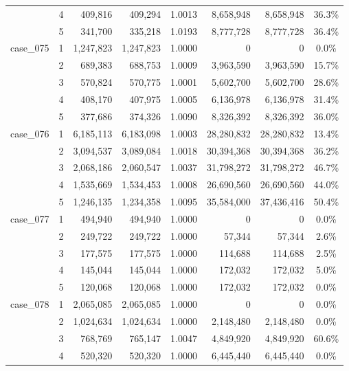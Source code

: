 \begin{footnotesize}
\begin{longtable}{l c rr c rr c}
 & 4 & 409{,}816 & 409{,}294 & 1.0013 & 8{,}658{,}948 & 8{,}658{,}948 & 36.3\% \\
 & 5 & 341{,}700 & 335{,}218 & 1.0193 & 8{,}777{,}728 & 8{,}777{,}728 & 36.4\% \\
\addlinespace[2pt]
case\_075 & 1 & 1{,}247{,}823 & 1{,}247{,}823 & 1.0000 & 0 & 0 & 0.0\% \\
 & 2 & 689{,}383 & 688{,}753 & 1.0009 & 3{,}963{,}590 & 3{,}963{,}590 & 15.7\% \\
 & 3 & 570{,}824 & 570{,}775 & 1.0001 & 5{,}602{,}700 & 5{,}602{,}700 & 28.6\% \\
 & 4 & 408{,}170 & 407{,}975 & 1.0005 & 6{,}136{,}978 & 6{,}136{,}978 & 31.4\% \\
 & 5 & 377{,}686 & 374{,}326 & 1.0090 & 8{,}326{,}392 & 8{,}326{,}392 & 36.0\% \\
\addlinespace[2pt]
case\_076 & 1 & 6{,}185{,}113 & 6{,}183{,}098 & 1.0003 & 28{,}280{,}832 & 28{,}280{,}832 & 13.4\% \\
 & 2 & 3{,}094{,}537 & 3{,}089{,}084 & 1.0018 & 30{,}394{,}368 & 30{,}394{,}368 & 36.2\% \\
 & 3 & 2{,}068{,}186 & 2{,}060{,}547 & 1.0037 & 31{,}798{,}272 & 31{,}798{,}272 & 46.7\% \\
 & 4 & 1{,}535{,}669 & 1{,}534{,}453 & 1.0008 & 26{,}690{,}560 & 26{,}690{,}560 & 44.0\% \\
 & 5 & 1{,}246{,}135 & 1{,}234{,}358 & 1.0095 & 35{,}584{,}000 & 37{,}436{,}416 & 50.4\% \\
\addlinespace[2pt]
case\_077 & 1 & 494{,}940 & 494{,}940 & 1.0000 & 0 & 0 & 0.0\% \\
 & 2 & 249{,}722 & 249{,}722 & 1.0000 & 57{,}344 & 57{,}344 & 2.6\% \\
 & 3 & 177{,}575 & 177{,}575 & 1.0000 & 114{,}688 & 114{,}688 & 2.5\% \\
 & 4 & 145{,}044 & 145{,}044 & 1.0000 & 172{,}032 & 172{,}032 & 5.0\% \\
 & 5 & 120{,}068 & 120{,}068 & 1.0000 & 172{,}032 & 172{,}032 & 0.0\% \\
\addlinespace[2pt]
case\_078 & 1 & 2{,}065{,}085 & 2{,}065{,}085 & 1.0000 & 0 & 0 & 0.0\% \\
 & 2 & 1{,}024{,}634 & 1{,}024{,}634 & 1.0000 & 2{,}148{,}480 & 2{,}148{,}480 & 0.0\% \\
 & 3 & 768{,}769 & 765{,}147 & 1.0047 & 4{,}849{,}920 & 4{,}849{,}920 & 60.6\% \\
 & 4 & 520{,}320 & 520{,}320 & 1.0000 & 6{,}445{,}440 & 6{,}445{,}440 & 0.0\% \\

\end{longtable}
\end{footnotesize}
